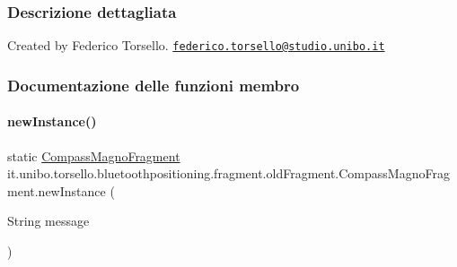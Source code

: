 \subsubsection{Descrizione dettagliata}
Created by Federico Torsello. \href{mailto:federico.torsello@studio.unibo.it}{\tt federico.\+torsello@studio.\+unibo.\+it} 

\subsubsection{Documentazione delle funzioni membro}
\hypertarget{classit_1_1unibo_1_1torsello_1_1bluetoothpositioning_1_1fragment_1_1oldFragment_1_1CompassMagnoFragment_a2fdc7669262528be61e2e0165b6a8901_a2fdc7669262528be61e2e0165b6a8901}{}\label{classit_1_1unibo_1_1torsello_1_1bluetoothpositioning_1_1fragment_1_1oldFragment_1_1CompassMagnoFragment_a2fdc7669262528be61e2e0165b6a8901_a2fdc7669262528be61e2e0165b6a8901} 
\paragraph{\texorpdfstring{new\+Instance()}{newInstance()}}
{\footnotesize\ttfamily static \hyperlink{classit_1_1unibo_1_1torsello_1_1bluetoothpositioning_1_1fragment_1_1oldFragment_1_1CompassMagnoFragment}{Compass\+Magno\+Fragment} it.\+unibo.\+torsello.\+bluetoothpositioning.\+fragment.\+old\+Fragment.\+Compass\+Magno\+Fragment.\+new\+Instance (\begin{DoxyParamCaption}\item[{String}]{message }\end{DoxyParamCaption})\hspace{0.3cm}{\ttfamily [static]}}


